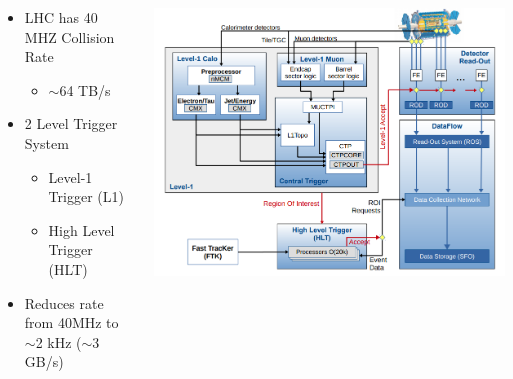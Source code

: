 \documentclass{beamer}
\newcommand*{\header}[1]{\fontsize{16}{8}\selectfont \textbf{{\color{MyPurple}{#1}}}}
\begin{document}
\begin{frame}
\begin{center}
\header{ATLAS Trigger}
\end{center}
\begin{columns}
\begin{column}{0.5\textwidth}
\begin{itemize}
\item LHC has 40 MHZ Collision Rate
\begin{itemize}
\item $\sim$64 TB/s 
\end{itemize}
\item 2 Level Trigger System
\begin{itemize}
\item Level-1 Trigger (L1)
\item High Level Trigger (HLT)
\end{itemize}
\item Reduces rate from 40MHz to $\sim$2 kHz ($\sim$3 GB/s)
\end{itemize}
\end{column}
\begin{column}{0.5\textwidth}
\includegraphics[width=1\textwidth]{figures/run2TDAQ}
\end{column}
\end{columns}
\end{frame}
\end{document}

